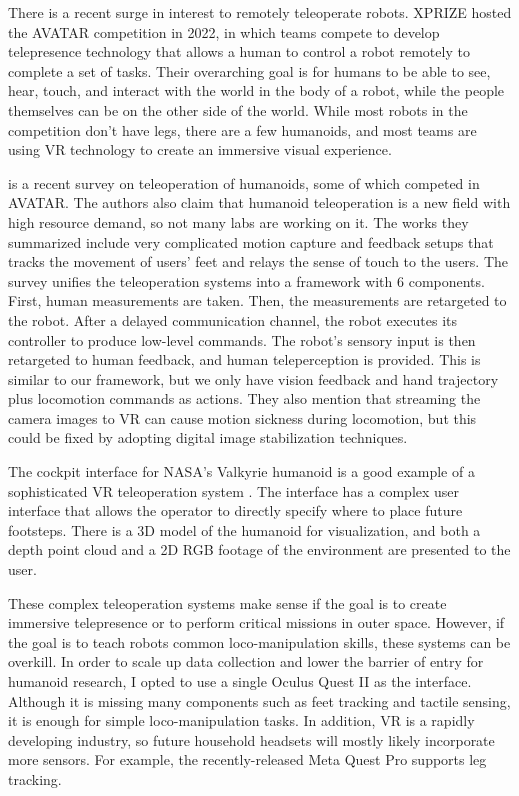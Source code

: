 There is a recent surge in interest to remotely teleoperate robots. 
XPRIZE hosted the AVATAR competition in 2022, in which teams compete to develop telepresence technology that allows a human to control a robot remotely to complete a set of tasks. 
Their overarching goal is for humans to be able to see, hear, touch, and interact with the world in the body of a robot, while the people themselves can be on the other side of the world.
While most robots in the competition don't have legs, there are a few humanoids, and most teams are using VR technology to create an immersive visual experience.

\cite{darvish2023teleoperation} is a recent survey on teleoperation of humanoids, some of which competed in AVATAR. The authors also claim that humanoid teleoperation is a new field with high resource demand, so not many labs are working on it. The works they summarized include very complicated motion capture and feedback setups that tracks the movement of users' feet and relays the sense of touch to the users. The survey unifies the teleoperation systems into a framework with 6 components. First, human measurements are taken. Then, the measurements are retargeted to the robot. After a delayed communication channel, the robot executes its controller to produce low-level commands. The robot's sensory input is then retargeted to human feedback, and human teleperception is provided.
This is similar to our framework, but we only have vision feedback and hand trajectory plus locomotion commands as actions. They also mention that streaming the camera images to VR can cause motion sickness during locomotion, but this could be fixed by adopting digital image stabilization techniques.

The cockpit interface for NASA's Valkyrie humanoid is a good example of a sophisticated VR teleoperation system \cite{nasa}. The interface has a complex user interface that allows the operator to directly specify where to place future footsteps. There is a 3D model of the humanoid for visualization, and both a depth point cloud and a 2D RGB footage of the environment are presented to the user. 

These complex teleoperation systems make sense if the goal is to create immersive telepresence or to perform critical missions in outer space. However, if the goal is to teach robots common loco-manipulation skills, these systems can be overkill. In order to scale up data collection and lower the barrier of entry for humanoid research, I opted to use a single Oculus Quest II as the interface. Although it is missing many components such as feet tracking and tactile sensing, it is enough for simple loco-manipulation tasks. In addition, VR is a rapidly developing industry, so future household headsets will mostly likely incorporate more sensors. For example, the recently-released Meta Quest Pro supports leg tracking.
